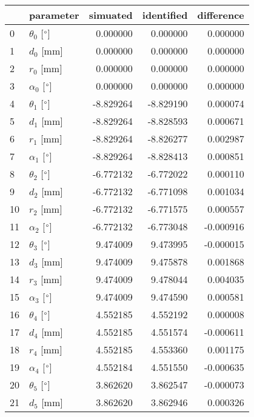 \documentclass{standalone}%
\begin{document}
%
\normalsize%
\begin{tabular}{llrrr}
\toprule
{} &                 parameter &  simuated & identified & difference \\
\midrule
0  &  $\theta_{0}$ [$\degree$] &  0.000000 &   0.000000 &   0.000000 \\
1  &              $d_{0}$ [mm] &  0.000000 &   0.000000 &   0.000000 \\
2  &              $r_{0}$ [mm] &  0.000000 &   0.000000 &   0.000000 \\
3  &  $\alpha_{0}$ [$\degree$] &  0.000000 &   0.000000 &   0.000000 \\
4  &  $\theta_{1}$ [$\degree$] & -8.829264 &  -8.829190 &   0.000074 \\
5  &              $d_{1}$ [mm] & -8.829264 &  -8.828593 &   0.000671 \\
6  &              $r_{1}$ [mm] & -8.829264 &  -8.826277 &   0.002987 \\
7  &  $\alpha_{1}$ [$\degree$] & -8.829264 &  -8.828413 &   0.000851 \\
8  &  $\theta_{2}$ [$\degree$] & -6.772132 &  -6.772022 &   0.000110 \\
9  &              $d_{2}$ [mm] & -6.772132 &  -6.771098 &   0.001034 \\
10 &              $r_{2}$ [mm] & -6.772132 &  -6.771575 &   0.000557 \\
11 &  $\alpha_{2}$ [$\degree$] & -6.772132 &  -6.773048 &  -0.000916 \\
12 &  $\theta_{3}$ [$\degree$] &  9.474009 &   9.473995 &  -0.000015 \\
13 &              $d_{3}$ [mm] &  9.474009 &   9.475878 &   0.001868 \\
14 &              $r_{3}$ [mm] &  9.474009 &   9.478044 &   0.004035 \\
15 &  $\alpha_{3}$ [$\degree$] &  9.474009 &   9.474590 &   0.000581 \\
16 &  $\theta_{4}$ [$\degree$] &  4.552185 &   4.552192 &   0.000008 \\
17 &              $d_{4}$ [mm] &  4.552185 &   4.551574 &  -0.000611 \\
18 &              $r_{4}$ [mm] &  4.552185 &   4.553360 &   0.001175 \\
19 &  $\alpha_{4}$ [$\degree$] &  4.552184 &   4.551550 &  -0.000635 \\
20 &  $\theta_{5}$ [$\degree$] &  3.862620 &   3.862547 &  -0.000073 \\
21 &              $d_{5}$ [mm] &  3.862620 &   3.862946 &   0.000326 \\

\end{tabular}
\end{document}
